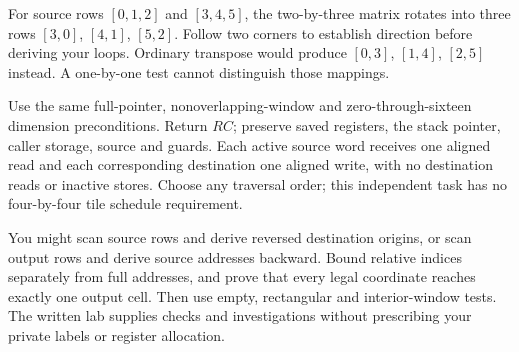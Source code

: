 For source rows $[0,1,2]$ and $[3,4,5]$, the two-by-three matrix rotates into
three rows $[3,0]$, $[4,1]$, $[5,2]$. Follow two corners to establish direction
before deriving your loops. Ordinary transpose would produce $[0,3]$, $[1,4]$,
$[2,5]$ instead. A one-by-one test cannot distinguish those mappings.

Use the same full-pointer, nonoverlapping-window and zero-through-sixteen dimension
preconditions. Return $RC$; preserve saved registers, the stack pointer, caller
storage, source and guards. Each active source word receives one aligned read
and each corresponding destination one aligned write, with no destination reads
or inactive stores. Choose any traversal order; this independent task has no
four-by-four tile schedule requirement.

You might scan source rows and derive reversed destination origins, or scan output
rows and derive source addresses backward. Bound relative indices separately from
full addresses, and prove that every legal coordinate reaches exactly one output
cell. Then use empty, rectangular and interior-window tests. The written lab
supplies checks and investigations without prescribing your private labels or
register allocation.
